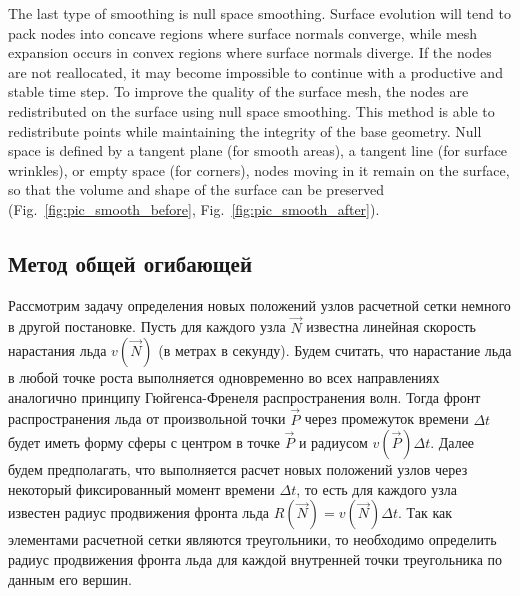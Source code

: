 \documentclass[
11pt,%
tightenlines,%
twoside,%
onecolumn,%
nofloats,%
nobibnotes,%
nofootinbib,%
superscriptaddress,%
noshowpacs,%
centertags]%
{revtex4}
\begin{document}
The last type of smoothing is null space smoothing.
Surface evolution will tend to pack nodes into concave regions where surface normals converge, while mesh expansion occurs in convex regions where surface normals diverge.
If the nodes are not reallocated, it may become impossible to continue with a productive and stable time step.
To improve the quality of the surface mesh, the nodes are redistributed on the surface using null space smoothing.
This method is able to redistribute points while maintaining the integrity of the base geometry.
Null space is defined by a tangent plane (for smooth areas), a tangent line (for surface wrinkles), or empty space (for corners), nodes moving in it remain on the surface, so that the volume and shape of the surface can be preserved (Fig.~\ref{fig:pic_smooth_before}, Fig.~\ref{fig:pic_smooth_after}).

\subsection{Метод общей огибающей}

Рассмотрим задачу определения новых положений узлов расчетной сетки немного в другой постановке.
Пусть для каждого узла $\vec{N}$ известна линейная скорость нарастания льда $v(\vec{N})$ (в метрах в секунду).
Будем считать, что нарастание льда в любой точке роста выполняется одновременно во всех направлениях аналогично принципу Гюйгенса-Френеля распространения волн.
Тогда фронт распространения льда от произвольной точки $\vec{P}$ через промежуток времени $\Delta t$ будет иметь форму сферы с центром в точке $\vec{P}$ и радиусом $v(\vec{P}) \Delta t$.
Далее будем предполагать, что выполняется расчет новых положений узлов через некоторый фиксированный момент времени $\Delta t$, то есть для каждого узла известен радиус продвижения фронта льда $R(\vec{N}) = v(\vec{N}) \Delta t$.
Так как элементами расчетной сетки являются треугольники, то необходимо определить радиус продвижения фронта льда для каждой внутренней точки треугольника по данным его вершин.
\end{document}
